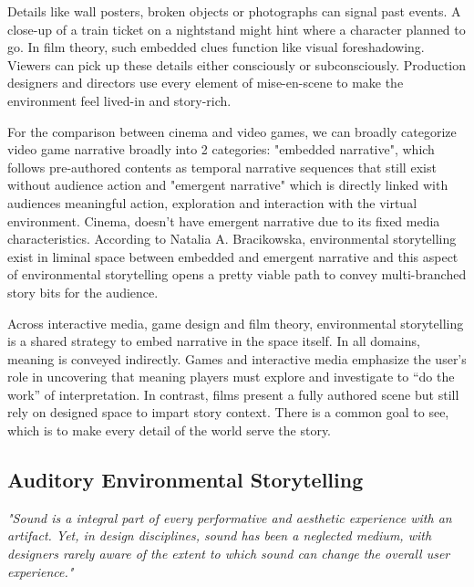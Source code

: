             Details like wall posters, broken objects or photographs can signal past events. A close-up of a train ticket on a nightstand might hint where a character planned to go. In film theory, such embedded clues function like visual foreshadowing. Viewers can pick up these details either consciously or subconsciously. Production designers and directors use every element of mise-en-scene to make the environment feel lived-in and story-rich.\par
            
            For the comparison between cinema and video games, we can broadly categorize video game narrative broadly into 2 categories: "embedded narrative", which follows pre-authored contents as temporal narrative sequences that still exist without audience action and "emergent narrative" which is directly linked with audiences meaningful action, exploration and interaction with the virtual environment\cite{Liminal_Space_Between_Embedded_and_Emergent_Narrative}. Cinema, doesn't have emergent narrative due to its fixed media characteristics. According to Natalia A. Bracikowska, environmental storytelling exist in liminal space between embedded and emergent narrative\cite{Liminal_Space_Between_Embedded_and_Emergent_Narrative} and this aspect of environmental storytelling opens a pretty viable path to convey multi-branched story bits for the audience.\par
            
            Across interactive media, game design and film theory, environmental storytelling is a shared strategy to embed narrative in the space itself. In all domains, meaning is conveyed indirectly. Games and interactive media emphasize the user’s role in uncovering that meaning players must explore and investigate to “do the work” of interpretation. In contrast, films present a fully authored scene but still rely on designed space to impart story context. There is a common goal to see, which is to make every detail of the world serve the story.\par
        \subsection{Auditory Environmental Storytelling}
            \emph{"Sound is a integral part of every performative and aesthetic experience with an artifact. Yet, in design disciplines, sound has been a neglected medium, with designers rarely aware of the extent to which sound can change the overall user experience."\cite{Sonic_Interaction_Design}}

